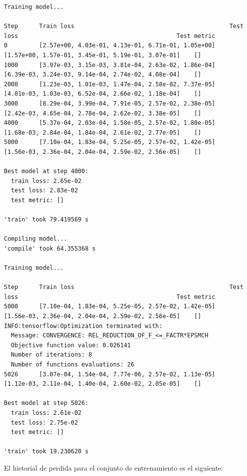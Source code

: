 \documentclass[
  spanish,
  us-letterpaper,
  DIV=11,
  numbers=noendperiod]{scrreprt}
\theoremstyle{definition}
\theoremstyle{plain}
\theoremstyle{remark}
\begin{document}
\begin{verbatim}
Training model...

Step      Train loss                                            Test loss                                             Test metric
0         [2.57e+00, 4.03e-01, 4.13e-01, 6.71e-01, 1.05e+00]    [1.57e+00, 1.57e-01, 3.45e-01, 5.19e-01, 3.07e-01]    []  
1000      [3.97e-03, 3.15e-03, 3.81e-04, 2.63e-02, 1.86e-04]    [6.39e-03, 3.24e-03, 9.14e-04, 2.74e-02, 4.08e-04]    []  
2000      [1.23e-03, 1.01e-03, 1.47e-04, 2.58e-02, 7.37e-05]    [4.01e-03, 1.03e-03, 6.52e-04, 2.66e-02, 1.18e-04]    []  
3000      [8.29e-04, 3.99e-04, 7.91e-05, 2.57e-02, 2.38e-05]    [2.42e-03, 4.65e-04, 2.78e-04, 2.62e-02, 3.38e-05]    []  
4000      [5.37e-04, 2.03e-04, 1.58e-05, 2.57e-02, 1.80e-05]    [1.68e-03, 2.84e-04, 1.84e-04, 2.61e-02, 2.77e-05]    []  
5000      [7.10e-04, 1.83e-04, 5.25e-05, 2.57e-02, 1.42e-05]    [1.56e-03, 2.36e-04, 2.04e-04, 2.59e-02, 2.56e-05]    []  

Best model at step 4000:
  train loss: 2.65e-02
  test loss: 2.83e-02
  test metric: []

'train' took 79.419569 s

Compiling model...
'compile' took 64.355368 s

Training model...

Step      Train loss                                            Test loss                                             Test metric
5000      [7.10e-04, 1.83e-04, 5.25e-05, 2.57e-02, 1.42e-05]    [1.56e-03, 2.36e-04, 2.04e-04, 2.59e-02, 2.56e-05]    []  
INFO:tensorflow:Optimization terminated with:
  Message: CONVERGENCE: REL_REDUCTION_OF_F_<=_FACTR*EPSMCH
  Objective function value: 0.026141
  Number of iterations: 8
  Number of functions evaluations: 26
5026      [3.07e-04, 1.54e-04, 7.77e-06, 2.57e-02, 1.13e-05]    [1.12e-03, 2.11e-04, 1.40e-04, 2.60e-02, 2.05e-05]    []  

Best model at step 5026:
  train loss: 2.61e-02
  test loss: 2.75e-02
  test metric: []

'train' took 19.230620 s
\end{verbatim}

El historial de perdida para el conjunto de entrenamiento es el
siguiente:
\end{document}
